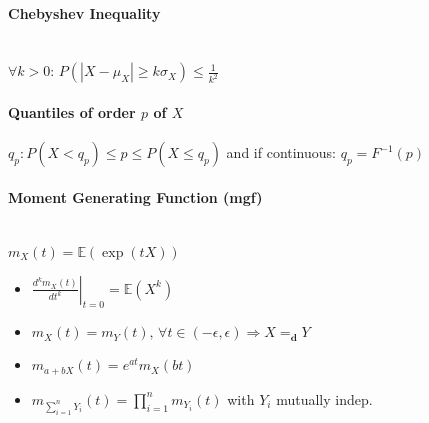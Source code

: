 \documentclass[paper=a4,fontsize=8pt,pagesize,DIV=calc]{scrartcl}
\newcounter{row}
\begin{document}
\begin{multicols}{3}
\paragraph{Chebyshev Inequality}~~\\$\forall k>0$: $P(|X-\mu_X|\geq k\sigma_X)\leq   \frac{1}{k^2}$ 
\paragraph{Quantiles of order $p$ of $X$} $q_p: P(X<q_p)\leq p \leq P(X\leq q_p)$ and if continuous: $q_p=F^{-1}(p)$
\paragraph{Moment Generating Function (mgf)}
~~\\$m_X(t)=\mathbb{E}(\exp(tX))$
\begin{itemize}
\item $\left. \frac{d^k m_X(t)}{dt^k}\right|_{t=0}=\mathbb{E}(X^k)$
\item $m_X(t)=m_Y(t) \textrm{, }\forall t \in (-\epsilon ,\epsilon) \Rightarrow X=_\textbf{d}Y$
\item $m_{a+bX}(t)=e^{at}m_X(bt)$
\item $m_{\sum^n_{i=1} Y_i}(t)=\prod^n_{i=1} m_{Y_i}(t)$ with $Y_i$ mutually indep.
\end{itemize}

\end{multicols}
\end{document}
